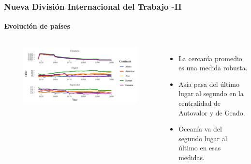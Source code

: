 \documentclass[professionalfont,fleqn]{beamer}
\begin{document}
		\begin{frame}
		\frametitle{Nueva División Internacional del Trabajo -II}
		\framesubtitle{Evolución de países}
		\begin{columns}[c] %
			
			
			\begin{flushleft}
			\begin{figure}
				\includegraphics[width=2\linewidth]{1950_2000_continent_all_presentation}
			\end{figure}
			\end{flushleft}
			
			
			
			\begin{itemize}
				\item<1-> La cercanía promedio es una medida robusta.
				\item<2-> Asia pasa del último lugar al segundo en la centralidad de Autovalor y de Grado.
				\item<3-> Oceanía va del segundo lugar al último en esas medidas.  
			\end{itemize}
		
		\end{columns}
		\end{frame}
		
\end{document}
